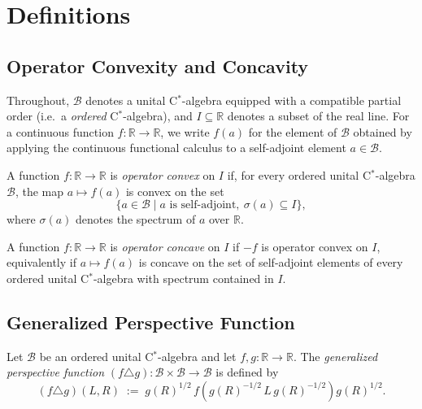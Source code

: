 \chapter{Definitions}

\section{Operator Convexity and Concavity}

Throughout, $\mathcal{B}$ denotes a unital C$^*$-algebra equipped with a compatible
partial order (i.e.\ a \emph{ordered} C$^*$-algebra), and $I \subseteq \mathbb{R}$
denotes a subset of the real line.
For a continuous function $f : \mathbb{R} \to \mathbb{R}$, we write $f(a)$ for the
element of $\mathcal{B}$ obtained by applying the continuous functional calculus to
a self-adjoint element $a \in \mathcal{B}$.

\begin{definition}
  \label{def:operator_convex}
  \leanok
  A function $f : \mathbb{R} \to \mathbb{R}$ is \emph{operator convex} on $I$ if, for
  every ordered unital C$^*$-algebra $\mathcal{B}$, the map $a \mapsto f(a)$ is convex
  on the set
  \[
    \{ a \in \mathcal{B} \mid a \text{ is self-adjoint},\ \sigma(a) \subseteq I \},
  \]
  where $\sigma(a)$ denotes the spectrum of $a$ over $\mathbb{R}$.
\end{definition}

\begin{definition}
  \label{def:operator_concave}
  \leanok
  A function $f : \mathbb{R} \to \mathbb{R}$ is \emph{operator concave} on $I$ if
  $-f$ is operator convex on $I$, equivalently if $a \mapsto f(a)$ is concave on the
  set of self-adjoint elements of every ordered unital C$^*$-algebra with spectrum
  contained in $I$.
\end{definition}

\section{Generalized Perspective Function}

\begin{definition}
  \label{def:gen_perspective}
  \leanok
  Let $\mathcal{B}$ be an ordered unital C$^*$-algebra and let $f, g : \mathbb{R} \to \mathbb{R}$.
  The \emph{generalized perspective function} $(f \triangle g) : \mathcal{B} \times \mathcal{B} \to \mathcal{B}$
  is defined by
  \[
    (f \triangle g)(L, R)
    \;:=\;
    g(R)^{1/2}\, f\!\left(g(R)^{-1/2}\, L\, g(R)^{-1/2}\right) g(R)^{1/2}.
  \]
\end{definition}

